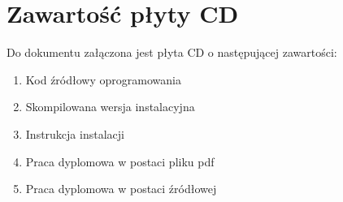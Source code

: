 \chapter{Zawartość płyty CD}
Do dokumentu załączona jest płyta CD o następującej zawartości:
\begin{enumerate}
\item Kod źródłowy oprogramowania
\item Skompilowana wersja instalacyjna
\item Instrukcja instalacji
\item Praca dyplomowa w postaci pliku pdf
\item Praca dyplomowa w postaci źródłowej
\end{enumerate}
